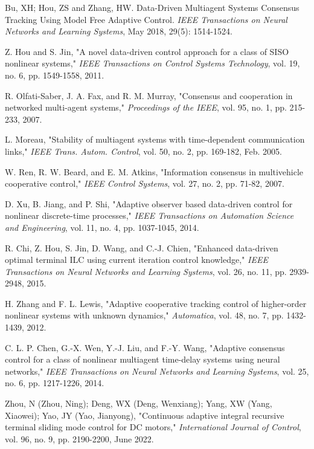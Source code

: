 \documentclass[journal,onecolumn]{IEEEtran}
\begin{document}
\begin{thebibliography}{99}
    
    Bu, XH; Hou, ZS and Zhang, HW. Data-Driven Multiagent Systems Consensus Tracking Using Model Free Adaptive Control. \textit{IEEE Transactions on Neural Networks and Learning Systems}, May 2018, 29(5): 1514-1524.
    
    Z. Hou and S. Jin, "A novel data-driven control approach for a class of SISO nonlinear systems," \textit{IEEE Transactions on Control Systems Technology}, vol. 19, no. 6, pp. 1549-1558, 2011.
    
    R. Olfati-Saber, J. A. Fax, and R. M. Murray, "Consensus and cooperation in networked multi-agent systems," \textit{Proceedings of the IEEE}, vol. 95, no. 1, pp. 215-233, 2007.
    
    L. Moreau, "Stability of multiagent systems with time-dependent
    communication links," \textit{IEEE Trans. Autom. Control}, vol. 50, no. 2, pp. 169-182, Feb. 2005.
    
    W. Ren, R. W. Beard, and E. M. Atkins, "Information consensus in multivehicle cooperative control," \textit{IEEE Control Systems}, vol. 27, no. 2, pp. 71-82, 2007.
    
    D. Xu, B. Jiang, and P. Shi, "Adaptive observer based data-driven control for nonlinear discrete-time processes," \textit{IEEE Transactions on Automation Science and Engineering}, vol. 11, no. 4, pp. 1037-1045, 2014.
    
    R. Chi, Z. Hou, S. Jin, D. Wang, and C.-J. Chien, "Enhanced data-driven optimal terminal ILC using current iteration control knowledge," \textit{IEEE Transactions on Neural Networks and Learning Systems}, vol. 26, no. 11, pp. 2939-2948, 2015.
    
    H. Zhang and F. L. Lewis, "Adaptive cooperative tracking control of higher-order nonlinear systems with unknown dynamics," \textit{Automatica}, vol. 48, no. 7, pp. 1432-1439, 2012.
    
    C. L. P. Chen, G.-X. Wen, Y.-J. Liu, and F.-Y. Wang, "Adaptive consensus control for a class of nonlinear multiagent time-delay systems using neural networks," \textit{IEEE Transactions on Neural Networks and Learning Systems}, vol. 25, no. 6, pp. 1217-1226, 2014.
    
    Zhou, N (Zhou, Ning); Deng, WX (Deng, Wenxiang); Yang, XW (Yang, Xiaowei); Yao, JY (Yao, Jianyong), "Continuous adaptive integral recursive terminal sliding mode control for DC motors," \textit{International Journal of Control}, vol. 96, no. 9, pp. 2190-2200, June 2022.
    

\end{thebibliography}
\end{document}
